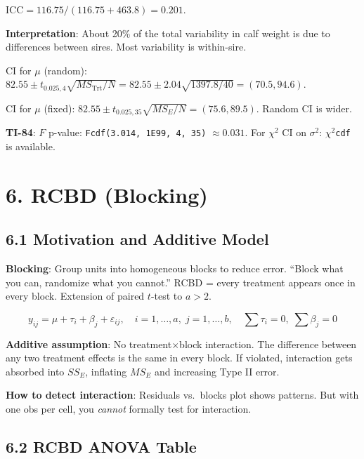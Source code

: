 \documentclass[9pt,letterpaper]{article}
\begin{document}
$\text{ICC} = 116.75/(116.75+463.8) = 0.201$.

\textbf{Interpretation}: About 20\% of the total variability in calf weight is due to differences between sires. Most variability is within-sire.

CI for $\mu$ (random): $82.55 \pm t_{0.025,4}\sqrt{MS_{\text{Trt}}/N} = 82.55 \pm 2.04\sqrt{1397.8/40} = (70.5, 94.6)$.

CI for $\mu$ (fixed): $82.55 \pm t_{0.025,35}\sqrt{MS_E/N} = (75.6, 89.5)$.  Random CI is wider.

\begin{calcbox}
\textbf{TI-84}: $F$ p-value: \texttt{Fcdf(3.014, 1E99, 4, 35)} $\approx 0.031$. For $\chi^2$ CI on $\sigma^2$: \texttt{$\chi^2$cdf} is available.
\end{calcbox}

\section{6. RCBD (Blocking)}

\subsection{6.1 Motivation and Additive Model}

\textbf{Blocking}: Group units into homogeneous blocks to reduce error. ``Block what you can, randomize what you cannot.'' RCBD = every treatment appears once in every block. Extension of paired $t$-test to $a > 2$.

\[
y_{ij} = \mu + \tau_i + \beta_j + \varepsilon_{ij}, \quad i=1,\ldots,a,\; j=1,\ldots,b, \quad \sum\tau_i=0,\; \sum\beta_j=0
\]

\textbf{Additive assumption}: No treatment$\times$block interaction. The difference between any two treatment effects is the same in every block. If violated, interaction gets absorbed into $SS_E$, inflating $MS_E$ and increasing Type II error.

\textbf{How to detect interaction}: Residuals vs.\ blocks plot shows patterns. But with one obs per cell, you \emph{cannot} formally test for interaction.

\subsection{6.2 RCBD ANOVA Table}
\end{document}
